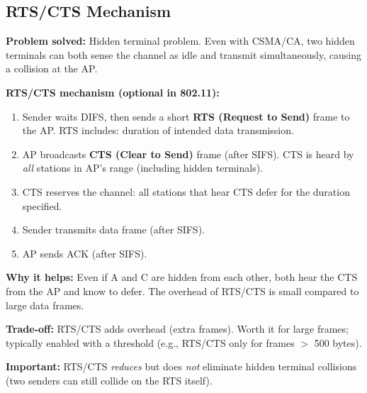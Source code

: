 \subsection{RTS/CTS Mechanism}
\label{sec:rtscst}

\begin{keybox}
\textbf{Problem solved:} Hidden terminal problem. Even with CSMA/CA, two hidden terminals can both sense the channel as idle and transmit simultaneously, causing a collision at the AP.

\medskip
\textbf{RTS/CTS mechanism (optional in 802.11):}
\begin{enumerate}[noitemsep]
    \item Sender waits DIFS, then sends a short \textbf{RTS (Request to Send)} frame to the AP. RTS includes: duration of intended data transmission.
    \item AP broadcasts \textbf{CTS (Clear to Send)} frame (after SIFS). CTS is heard by \emph{all} stations in AP's range (including hidden terminals).
    \item CTS reserves the channel: all stations that hear CTS defer for the duration specified.
    \item Sender transmits data frame (after SIFS).
    \item AP sends ACK (after SIFS).
\end{enumerate}

\medskip
\textbf{Why it helps:} Even if A and C are hidden from each other, both hear the CTS from the AP and know to defer. The overhead of RTS/CTS is small compared to large data frames.

\medskip
\textbf{Trade-off:} RTS/CTS adds overhead (extra frames). Worth it for large frames; typically enabled with a threshold (e.g., RTS/CTS only for frames $>$ 500 bytes).

\medskip
\textbf{Important:} RTS/CTS \emph{reduces} but does \emph{not} eliminate hidden terminal collisions (two senders can still collide on the RTS itself).
\end{keybox}

